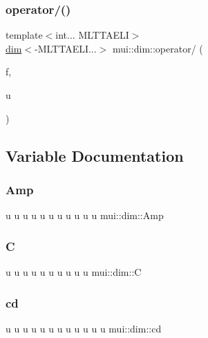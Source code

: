 \subsubsection{\texorpdfstring{operator/()}{operator/()}\hspace{0.1cm}{\footnotesize\ttfamily [4/4]}}
{\footnotesize\ttfamily template$<$int... M\+L\+T\+T\+A\+E\+LI$>$ \\
\hyperlink{structmui_1_1dim_1_1dim}{dim}$<$-\/M\+L\+T\+T\+A\+E\+L\+I...$>$ mui\+::dim\+::operator/ (\begin{DoxyParamCaption}\item[{const double}]{f,  }\item[{const \hyperlink{structmui_1_1dim_1_1dim}{dim}$<$ M\+L\+T\+T\+A\+E\+L\+I... $>$ \&}]{u }\end{DoxyParamCaption})\hspace{0.3cm}{\ttfamily [inline]}}



\subsection{Variable Documentation}
\mbox{\label{namespacemui_1_1dim_ac013a8ddbd164a00b696e1fbe3233f87}} 
\subsubsection{\texorpdfstring{Amp}{Amp}}
{\footnotesize\ttfamily u u u u u u u u u u u mui\+::dim\+::\+Amp}

\mbox{\label{namespacemui_1_1dim_a819cc406ce7c3b35bd3bbd6724ff8d42}} 
\subsubsection{\texorpdfstring{C}{C}}
{\footnotesize\ttfamily u u u u u u u u u u mui\+::dim\+::C}

\mbox{\label{namespacemui_1_1dim_ab696eff2ae551b4df3f86066522b86d7}} 
\subsubsection{\texorpdfstring{cd}{cd}}
{\footnotesize\ttfamily u u u u u u u u u u u u mui\+::dim\+::cd}

